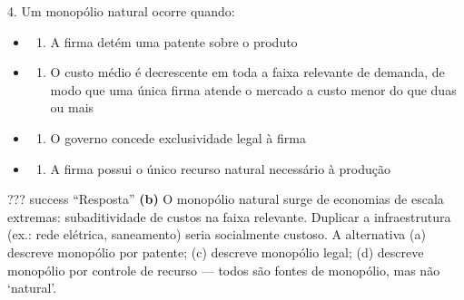 \documentclass[11pt,twoside,openright]{book}
\providecommand{\tightlist}{\setlength{\itemsep}{0pt}\setlength{\parskip}{0pt}}
\begin{document}
\begin{infobox}{4. Um monopólio natural ocorre quando:}

\begin{itemize}
\tightlist
\item
  \begin{enumerate}
  \def\labelenumi{(\alph{enumi})}
  \tightlist
  \item
    A firma detém uma patente sobre o produto
  \end{enumerate}
\item
  \begin{enumerate}
  \def\labelenumi{(\alph{enumi})}
  \setcounter{enumi}{1}
  \tightlist
  \item
    O custo médio é decrescente em toda a faixa relevante de demanda, de
    modo que uma única firma atende o mercado a custo menor do que duas
    ou mais
  \end{enumerate}
\item
  \begin{enumerate}
  \def\labelenumi{(\alph{enumi})}
  \setcounter{enumi}{2}
  \tightlist
  \item
    O governo concede exclusividade legal à firma
  \end{enumerate}
\item
  \begin{enumerate}
  \def\labelenumi{(\alph{enumi})}
  \setcounter{enumi}{3}
  \tightlist
  \item
    A firma possui o único recurso natural necessário à produção
  \end{enumerate}
\end{itemize}

??? success ``Resposta'' \textbf{(b)} O monopólio natural surge de
economias de escala extremas: subaditividade de custos na faixa
relevante. Duplicar a infraestrutura (ex.: rede elétrica, saneamento)
seria socialmente custoso. A alternativa (a) descreve monopólio por
patente; (c) descreve monopólio legal; (d) descreve monopólio por
controle de recurso --- todos são fontes de monopólio, mas não
`natural'.

\end{infobox}
\end{document}
